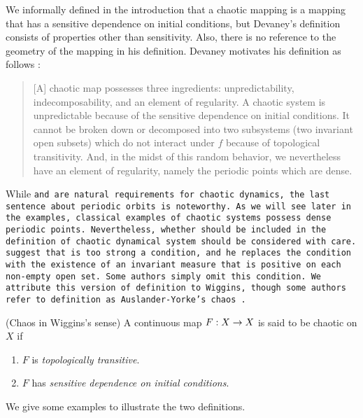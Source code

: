 \documentclass[12pt,draft,twoside]{book}
\begin{document}
We informally defined in the introduction that a chaotic mapping is a mapping that has a sensitive dependence on initial conditions, but Devaney's definition consists of properties other than sensitivity.
Also, there is no reference to the geometry of the mapping in his definition.
Devaney motivates his definition as follows \citep[p.50]{devaney}:
\begin{quotation}
  [A] chaotic map possesses three ingredients:
  unpredictability, indecomposability, and an element of regularity.
  A chaotic system is unpredictable because of the sensitive dependence on initial conditions.
  It cannot be broken down or decomposed into two subsystems (two invariant open subsets) which do not interact under $f$ because of topological transitivity.
  And, in the midst of this random behavior, we nevertheless have an element of regularity, namely the periodic points which are dense.
\end{quotation}
While \tt and \sdic are natural requirements for chaotic dynamics, the last sentence about periodic orbits is noteworthy.
As we will see later in the examples, classical examples of chaotic systems possess dense periodic points.
Nevertheless, whether \dpp should be included in the definition of chaotic dynamical system should be considered with care.
\citet{glasner} suggest that \dpp is too strong a condition, and he replaces the condition with the existence of an invariant measure that is positive on each non-empty open set. 
Some authors simply omit this condition.
We attribute this version of definition to Wiggins, though some authors refer to definition as Auslander-Yorke's chaos \citep{blanchard}.
\begin{definition}
  (Chaos in Wiggins's sense)
  A continuous map $F: X\rightarrow X$ is said to be chaotic on $X$ if
  \begin{enumerate}
    \item $F$ is \textit{topologically transitive}.
    \item $F$ has \textit{sensitive dependence on initial conditions}.
  \end{enumerate}
\end{definition}
We give some examples to illustrate the two definitions.
\end{document}

